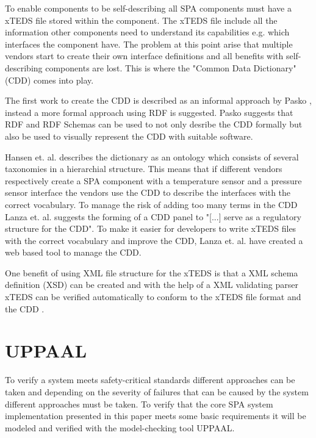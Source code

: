 
To enable components to be self-describing all SPA components must have a xTEDS
file stored within the component. The xTEDS file include all the information
other components need to understand its capabilities e.g. which interfaces the
component have. The problem at this point arise that multiple vendors start to
create their own interface definitions and all benefits with self-describing
components are lost. This is where the "Common Data Dictionary" (CDD) comes
into play.


The first work to create the CDD is described as an informal approach by Pasko
\cite{pasko2011}, instead a more formal approach using RDF is suggested. Pasko
suggests that RDF and RDF Schemas can be used to not only desribe the CDD
formally but also be used to visually represent the CDD with suitable software.

Hansen et. al.  \cite{hansen2012} describes the dictionary as an ontology which
consists of several taxonomies in a hierarchial structure. This means that if
different vendors respectively create a SPA component with a temperature sensor
and a pressure sensor interface the vendors use the CDD to describe the
interfaces with the correct vocabulary. To manage the risk of adding too
many terms in the CDD Lanza et. al. \cite{lanza2010} suggests the forming of a
CDD panel to "[...] serve as a regulatory structure for the CDD". To make it
easier for developers to write xTEDS files with the correct vocabulary and
improve the CDD, Lanza et. al.  \cite{lanza2010} have created a web based tool
to manage the CDD.

One benefit of using XML file structure for the xTEDS is that a XML schema
definition (XSD) can be created and with the help of a XML validating parser
xTEDS can be verified automatically to conform to the xTEDS file format and the
CDD \cite{lanza2010}.


\section{UPPAAL}
To verify a system meets safety-critical standards different approaches can
be taken and depending on the severity of failures that can be caused by the
system different approaches must be taken. To verify that the core SPA system
implementation presented in this paper meets some basic requirements it will be
modeled and verified with the model-checking tool UPPAAL.

